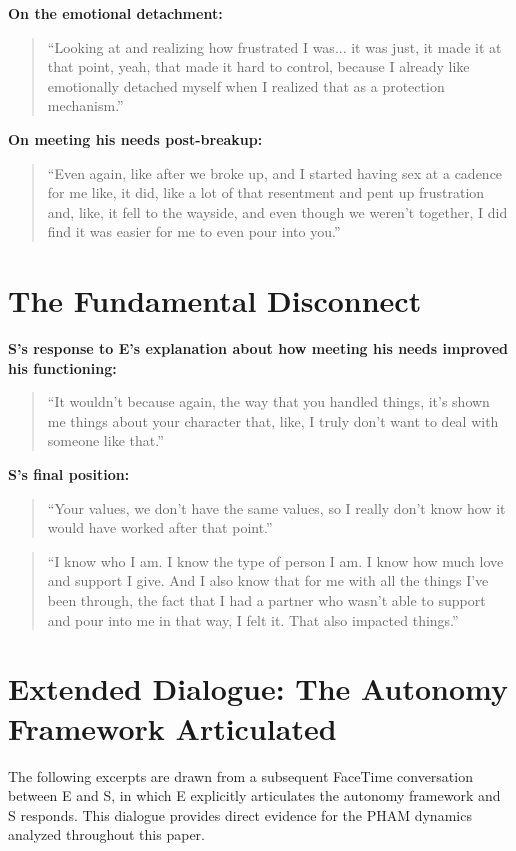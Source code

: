\documentclass[12pt,openany]{book}
\numberwithin{equation}{chapter}
\begin{document}
\textbf{On the emotional detachment:}
\begin{quote}
``Looking at and realizing how frustrated I was... it was just, it made it at that point, yeah, that made it hard to control, because I already like emotionally detached myself when I realized that as a protection mechanism.''
\end{quote}

\textbf{On meeting his needs post-breakup:}
\begin{quote}
``Even again, like after we broke up, and I started having sex at a cadence for me like, it did, like a lot of that resentment and pent up frustration and, like, it fell to the wayside, and even though we weren't together, I did find it was easier for me to even pour into you.''
\end{quote}

\section{The Fundamental Disconnect}

\textbf{S's response to E's explanation about how meeting his needs improved his functioning:}
\begin{quote}
``It wouldn't because again, the way that you handled things, it's shown me things about your character that, like, I truly don't want to deal with someone like that.''
\end{quote}

\textbf{S's final position:}
\begin{quote}
``Your values, we don't have the same values, so I really don't know how it would have worked after that point.''
\end{quote}

\begin{quote}
``I know who I am. I know the type of person I am. I know how much love and support I give. And I also know that for me with all the things I've been through, the fact that I had a partner who wasn't able to support and pour into me in that way, I felt it. That also impacted things.''
\end{quote}

\section{Extended Dialogue: The Autonomy Framework Articulated}

The following excerpts are drawn from a subsequent FaceTime conversation between E and S, in which E explicitly articulates the autonomy framework and S responds. This dialogue provides direct evidence for the PHAM dynamics analyzed throughout this paper.
\end{document}
